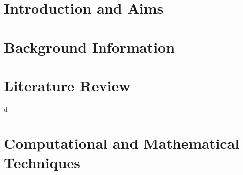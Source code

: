 \documentclass[a4paper,12pt]{report}
\begin{document}
\pagestyle{empty}
\setcounter{page}{1}

\def\localpath{ThesisFrontmatter}

\sglspace


\tableofcontents
\newpage

\newpage


\newpage
\setcounter{page}{0}
\pagestyle{thesisheadings}
%
\def\localpath{Ch1}
\chapter{Introduction and Aims}
\dblspace

%
\def\localpath{Ch2}
\chapter{Background Information}
\dblspace
\begin{quote}{\em }\end{quote}


%
\def\localpath{Ch3}
\chapter{Literature Review}
\dblspace
\begin{quote}{\em }\end{quote}

d
%
\def\localpath{Ch4}
\chapter{Computational and Mathematical Techniques}
\dblspace
\begin{quote}{\em }\end{quote}


%
\def\localpath{Ch5}
\end{document}
